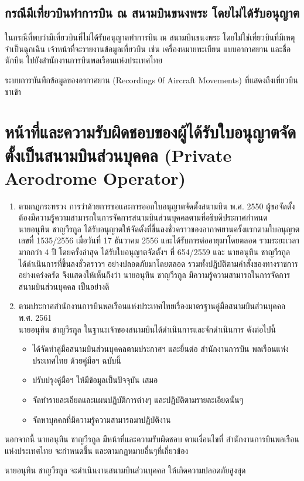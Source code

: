 \subsection{กรณีมีเที่ยวบินทำการบิน ณ สนามบินขนงพระ โดยไม่ได้รับอนุญาต}

ในกรณีที่พบว่ามีเที่ยวบินที่ไม่ได้รับอนุญาตทำการบิน ณ สนามบินขนงพระ โดยไม่ใช่เที่ยวบินที่มีเหตุจำเป็นฉุกเฉิน เจ้าหน้าที่จะรายงานข้อมูลเที่ยวบิน เช่น เครื่องหมายทะเบียน แบบอากาศยาน และชื่อนักบิน ไปยังสำนักงานการบินพลเรือนแห่งประเทศไทย

ระบบการบันทึกข้อมูลของอากาศยาน (Recordings 0f Aircraft Movements) ที่แสดงถึงเที่ยวบินขาเข้า

\section{หน้าที่และความรับผิดชอบของผู้ได้รับใบอนุญาตจัดตั้งเป็นสนามบินส่วนบุคคล (Private Aerodrome Operator)}

\begin{enumerate}
	\item ตามกฎกระทรวง การว่าด้วยการขอและการออกใบอนุญาตจัดตั้งสนามบิน พ.ศ. 2550  ผู้ขอจัดตั้งต้องมีความรู้ความสามารถในการจัดการสนามบินส่วนบุคคลตามที่อธิบดีประกาศกำหนด \\

	นายอนุทิน ชาญวีรกูล ได้รับอนุญาตให้จัดตั้งที่ขึ้นลงชั่วคราวของอากาศยานครั้งแรกตามใบอนุญาตเลขที่ 1535/2556 เมื่อวันที่ 17 ธันวาคม 2556 และได้รับการต่ออายุมาโดยตลอด รวมระยะเวลามากกว่า 4 ปี โดยครั้งล่าสุด ได้รับใบอนุญาตจัดตั้งฯ ที่ 654/2559 และ นายอนุทิน ชาญวีรกูล ได้ดำเนินการที่ขึ้นลงชั่วคราวฯ อย่างปลอดภัยมาโดยตลอด รวมทั้งปฏิบัติตามคำสั่งของทางราชการอย่างเคร่งครัด   จึงแสดงให้เห็นถึงว่า นายอนุทิน ชาญวีรกูล มีความรู้ความสามารถในการจัดการสนามบินส่วนบุคคล เป็นอย่างดี
	\item ตามประกาศสำนักงานการบินพลเรือนแห่งประเทศไทยเรื่องมาตรฐานคู่มือสนามบินส่วนบุคคล พ.ศ. 2561 \\
	นายอนุทิน ชาญวีรกูล ในฐานะเจ้าของสนามบินได้ดำเนินการและจักดำเนินการ ดังต่อไปนี้
	\begin{itemize}
		\item ได้จัดทำคู่มือสนามบินส่วนบุคคลตามประกาศฯ และยื่นต่อ สำนักงานการบิน
พลเรือนแห่งประเทศไทย ด้วยคู่มือฯ ฉบับนี้
		\item ปรับปรุงคู่มือฯ ให้มีข้อมูลเป็นปัจจุบัน เสมอ
		\item จัดทำรายละเอียดและแผนปฏิบัติการต่างๆ และปฏิบัติตามรายละเอียดนั้นๆ
		\item จัดหาบุคคลที่มีความรู้ความสามารถมาปฏิบัติงาน
	\end{itemize}
\end{enumerate}

นอกจากนี้ นายอนุทิน ชาญวีรกูล มีหน้าที่และความรับผิดชอบ ตามเงื่อนไขที่ สำนักงานการบินพลเรือนแห่งประเทศไทย จะกำหนดขึ้น และตามกฎหมายอื่นๆที่เกี่ยวข้อง

นายอนุทิน ชาญวีรกูล จะดำเนินงานสนามบินส่วนบุคคล ให้เกิดความปลอดภัยสูงสุด 
